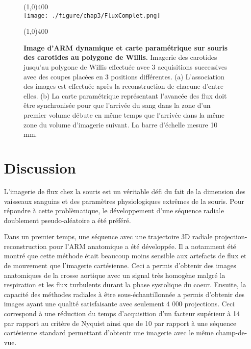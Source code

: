 \begin{figure}[H]
\centering \line(1,0){400} \\
\texttt{[image: ./figure/chap3/FluxComplet.png]}
\caption[Images d'ARM dynamique et carte paramétrique sur souris des carotides au niveau du polygone de Willis.]{\label{fig:FluxComplet} \textbf{Image d'ARM dynamique et carte paramétrique sur souris des carotides au polygone de Willis.} Imagerie des carotides jusqu'au polygone de Willis effectuée avec 3 acquisitions successives avec des coupes placées en 3 positions différentes. (a) L'association des images est effectuée après la reconstruction de chacune d'entre elles. (b) La carte paramétrique représentant l'avancée des flux doit être synchronisée pour que l'arrivée du sang dans la zone d'un premier volume débute en même temps que l'arrivée dans la même zone du volume d'imagerie suivant. La barre d'échelle mesure 10 mm.}
\line(1,0){400} \\ \end{figure}

\section{Discussion}

L'imagerie de flux chez la souris est un véritable défi du fait de la dimension des vaisseaux sanguins et des paramètres physiologiques extrêmes de la souris. Pour répondre à cette problèmatique, le développement d'une séquence radiale doublement pseudo-aléatoire a été préféré.

Dans un premier temps, une séquence avec une trajectoire 3D radiale projection-reconstruction pour l’ARM anatomique a été développée. Il a notamment été montré que cette méthode était beaucoup moins sensible aux artefacts de flux et de mouvement que l’imagerie cartésienne. Ceci a permis d’obtenir des images anatomiques de la crosse aortique avec un signal très homogène malgré la respiration et les flux turbulents durant la phase systolique du coeur. Ensuite, la capacité des méthodes radiales à être sous-échantillonnée a permis d’obtenir des images ayant une qualité satisfaisante avec seulement 4 000 projections. Ceci correspond à une réduction du temps d’acquisition d'un facteur supérieur à 14 par rapport au critère de Nyquist ainsi que de 10 par rapport à une séquence cartésienne standard permettant d’obtenir une imagerie avec le même champ-de-vue. 

